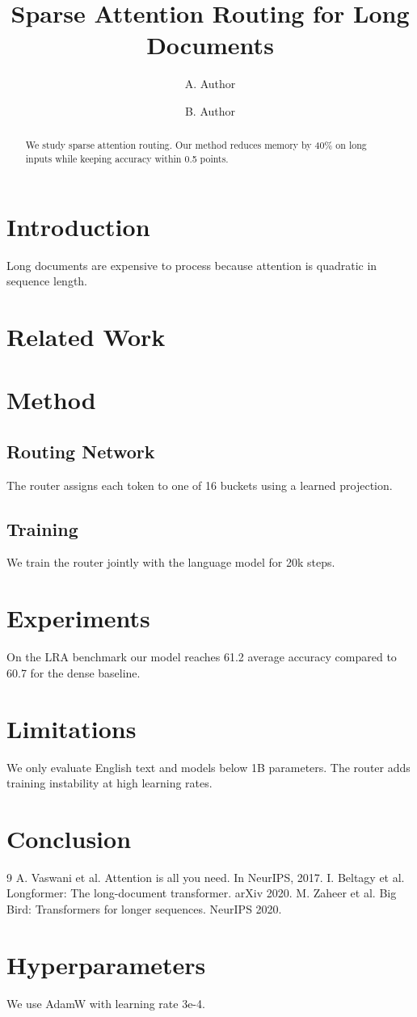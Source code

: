 \documentclass[10pt,twocolumn]{article}
\title{Sparse Attention Routing for Long Documents}
\author{A. Author \and B. Author}
\begin{document}
\maketitle
\begin{abstract}
We study sparse attention routing. Our method reduces memory by 40\% on long inputs while keeping accuracy within 0.5 points.
\end{abstract}
\section{Introduction}
Long documents are expensive to process because attention is quadratic in sequence length. \lipsum[1-2]
\section{Related Work}
\lipsum[3]
\section{Method}
\subsection{Routing Network}
The router assigns each token to one of 16 buckets using a learned projection. \lipsum[4]
\subsection{Training}
We train the router jointly with the language model for 20k steps. \lipsum[5]
\section{Experiments}
On the LRA benchmark our model reaches 61.2 average accuracy compared to 60.7 for the dense baseline. \lipsum[6-7]
\section{Limitations}
We only evaluate English text and models below 1B parameters. The router adds training instability at high learning rates.
\section{Conclusion}
\lipsum[8]
\begin{thebibliography}{9}
 A. Vaswani et al. Attention is all you need. In NeurIPS, 2017.
 I. Beltagy et al. Longformer: The long-document transformer. arXiv 2020.
 M. Zaheer et al. Big Bird: Transformers for longer sequences. NeurIPS 2020.
\end{thebibliography}
\appendix
\section{Hyperparameters}
We use AdamW with learning rate 3e-4. \lipsum[9]
\end{document}

